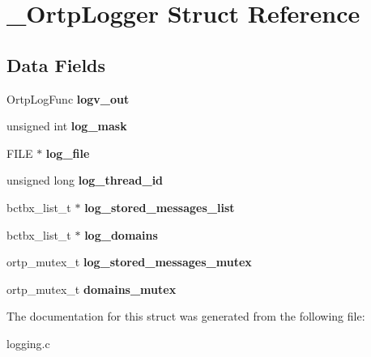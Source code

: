 \section{\+\_\+\+Ortp\+Logger Struct Reference}
\label{struct__OrtpLogger}
\subsection*{Data Fields}
\begin{DoxyCompactItemize}
\item 
\mbox{\label{struct__OrtpLogger_a29d9668f04551c4ed65b104a5ae36137}} 
Ortp\+Log\+Func {\bfseries logv\+\_\+out}
\item 
\mbox{\label{struct__OrtpLogger_ae1ef83c26e0c8fa7053d9dd2eda42486}} 
unsigned int {\bfseries log\+\_\+mask}
\item 
\mbox{\label{struct__OrtpLogger_a9a4c34e26fb13d18efd9a990cc8eddef}} 
F\+I\+LE $\ast$ {\bfseries log\+\_\+file}
\item 
\mbox{\label{struct__OrtpLogger_a922bccb1b882a50be41c7b02d8f0b284}} 
unsigned long {\bfseries log\+\_\+thread\+\_\+id}
\item 
\mbox{\label{struct__OrtpLogger_a209e8c9d494a5e07cf4c47e7f211f396}} 
bctbx\+\_\+list\+\_\+t $\ast$ {\bfseries log\+\_\+stored\+\_\+messages\+\_\+list}
\item 
\mbox{\label{struct__OrtpLogger_a59bc9e2537208ebe451da1748e3fc179}} 
bctbx\+\_\+list\+\_\+t $\ast$ {\bfseries log\+\_\+domains}
\item 
\mbox{\label{struct__OrtpLogger_a0798d4737e48d7b56ba1c07fe41969ed}} 
ortp\+\_\+mutex\+\_\+t {\bfseries log\+\_\+stored\+\_\+messages\+\_\+mutex}
\item 
\mbox{\label{struct__OrtpLogger_a7f91bd179499f68d5677926960d473e4}} 
ortp\+\_\+mutex\+\_\+t {\bfseries domains\+\_\+mutex}
\end{DoxyCompactItemize}


The documentation for this struct was generated from the following file\+:\begin{DoxyCompactItemize}
\item 
logging.\+c\end{DoxyCompactItemize}
